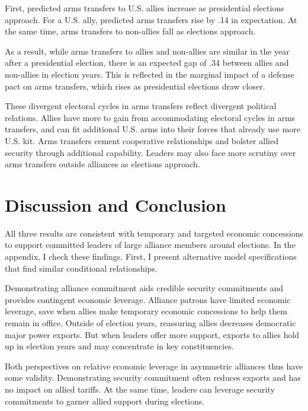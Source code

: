 \documentclass[12pt]{article}
\begin{document}
First, predicted arms transfers to U.S. allies increase as presidential elections approach.
For a U.S. ally, predicted arms transfers rise by .14 in expectation. 
At the same time, arms transfers to non-allies fall as elections approach. 


As a result, while arms transfers to allies and non-allies are similar in the year after a presidential election, there is an expected gap of .34 between allies and non-allies in election years.
This is reflected in the marginal impact of a defense pact on arms transfers, which rises as presidential elections draw closer.


These divergent electoral cycles in arms transfers reflect divergent political relations.
Allies have more to gain from accommodating electoral cycles in arms transfers, and can fit additional U.S. arms into their forces that already use more U.S. kit.
Arms transfers cement cooperative relationships and bolster allied security through additional capability.
Leaders may also face more scrutiny over arms transfers outside alliances as elections approach. 




\section{Discussion and Conclusion}


All three results are consistent with temporary and targeted economic concessions to support committed leaders of large alliance members around elections. 
In the appendix, I check these findings.
First, I present alternative model specifications that find similar conditional relationships.


Demonstrating alliance commitment aids credible security commitments and provides contingent economic leverage. 
Alliance patrons have limited economic leverage, save when allies make temporary economic concessions to help them remain in office. 
Outside of election years, reassuring allies decreases democratic major power exports.
But when leaders offer more support, exports to allies hold up in election years and may concentrate in key constituencies.


Both perspectives on relative economic leverage in asymmetric alliances thus have some validity. 
Demonstrating security commitment often reduces exports and has no impact on allied tariffs. 
At the same time, leaders can leverage security commitments to garner allied support during elections. 
\end{document}
